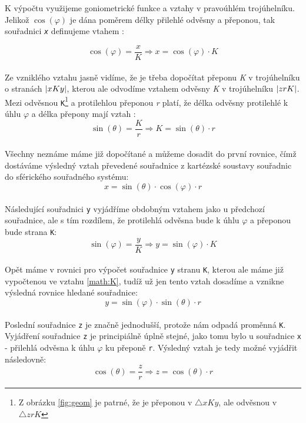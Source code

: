 \newpage

K výpočtu využijeme goniometrické funkce  a vztahy v pravoúhlém trojúhelníku. Jelikož $ \cos (\varphi) $ je dána poměrem délky přilehlé odvěsny a přeponou, tak souřadnici \texttt{\textit{x}} definujeme vtahem \cite{Goniometrie}:
 
\begin{equation}
 \cos (\varphi) = \frac{x}{K}  \Rightarrow x = \cos (\varphi) \cdot K
\end{equation}
\\
Ze vzniklého vztahu jasně vidíme, že je třeba dopočítat přeponu \textit{K} v trojúhelníku  o stranách $\arrowvert xKy\arrowvert$, kterou ale odvodíme vztahem odvěsny \textit{K} v trojúhelníku $\arrowvert zrK\arrowvert$. Mezi odvěsnou \texttt{K}\footnote{Z obrázku \ref{fig:geom} je patrné, že je přeponou v $\bigtriangleup xKy$, ale odvěsnou v $\bigtriangleup zrK$} a protilehlou přeponou \textit{r} platí, že délka odvěsny protilehlé k úhlu $\varphi$ a délka přepony mají vztah \cite{Goniometrie}:
\\
\begin{equation}
\label{math:K}
\sin (\theta) = \frac{K}{r}  \Rightarrow K = \sin (\theta) \cdot r
\end{equation}
\\
Všechny neznáme máme již dopočítané a můžeme dosadit do první rovnice, čímž dostáváme výsledný vztah převedené souřadnice z kartézské soustavy souřadnic do sférického souřadného systému:
\\
\begin{equation}
\label{math:x}
x = \sin (\theta) \cdot  \cos (\varphi) \cdot r
\end{equation}
\\
Následující souřadnici \texttt{y} vyjádříme obdobným vztahem jako u předchozí souřadnice, ale s tím rozdílem, že protilehlá odvěsna bude k úhlu $\varphi$ a přeponou bude strana \texttt{K}:
\\
\begin{displaymath}
\sin (\varphi) = \frac{y}{K}  \Rightarrow y = \sin (\varphi) \cdot K
\end{displaymath}
\\
Opět máme v rovnici pro výpočet souřadnice \texttt{y} stranu \texttt{K}, kterou ale máme již vypočtenou ve vztahu \ref{math:K}, tudíž už jen tento vztah dosadíme a vznikne výsledná rovnice hledané  souřadnice:
\\
\begin{equation}
\label{math:y}
y = \sin (\varphi) \cdot \sin (\theta) \cdot r
\end{equation}
\\
Poslední souřadnice \texttt{z} je značně jednodušší, protože nám odpadá proměnná \texttt{K}. Vyjádření souřadnice \texttt{z} je principiálně úplně stejné, jako tomu bylo u souřadnice \texttt{x} - přilehlá odvěsna k úhlu $\varphi$ ku přeponě \texttt{r}. Výsledný vztah je tedy možné vyjádřit následovně:
\\
\begin{equation}
\label{math:z}
\cos (\theta) = \frac{z}{r} \Rightarrow z = \cos (\theta) \cdot r
\end{equation}

